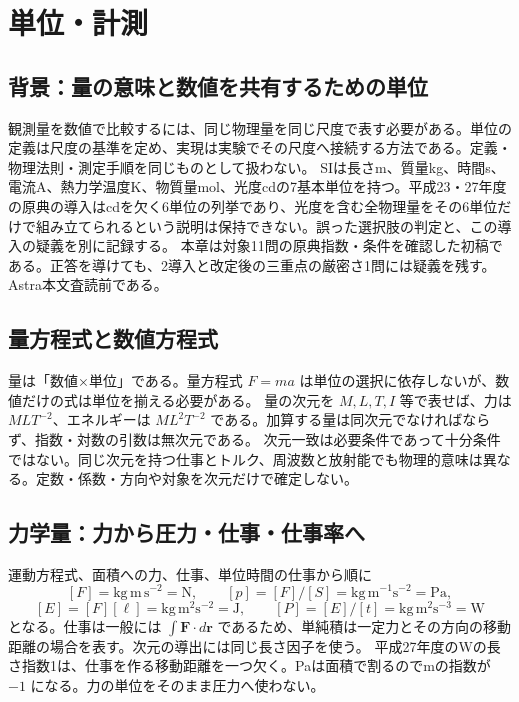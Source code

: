 \chapter{単位・計測}
\section{背景：量の意味と数値を共有するための単位}
観測量を数値で比較するには、同じ物理量を同じ尺度で表す必要がある。単位の定義は尺度の基準を定め、実現は実験でその尺度へ接続する方法である。定義・物理法則・測定手順を同じものとして扱わない。
SIは長さm、質量kg、時間s、電流A、熱力学温度K、物質量mol、光度cdの7基本単位を持つ。平成23・27年度の原典の導入はcdを欠く6単位の列挙であり、光度を含む全物理量をその6単位だけで組み立てられるという説明は保持できない。誤った選択肢の判定と、この導入の疑義を別に記録する\cite{si_brochure9}。
本章は対象11問の原典指数・条件を確認した初稿である。正答を導けても、2導入と改定後の三重点の厳密さ1問には疑義を残す。Astra本文査読前である。

\section{量方程式と数値方程式}\label{theory:units:quantity}
量は「数値×単位」である。量方程式 \(F=ma\) は単位の選択に依存しないが、数値だけの式は単位を揃える必要がある。
量の次元を \(M,L,T,I\) 等で表せば、力は \(MLT^{-2}\)、エネルギーは \(ML^2T^{-2}\) である。加算する量は同次元でなければならず、指数・対数の引数は無次元である。
次元一致は必要条件であって十分条件ではない。同じ次元を持つ仕事とトルク、周波数と放射能でも物理的意味は異なる。定数・係数・方向や対象を次元だけで確定しない。

\section{力学量：力から圧力・仕事・仕事率へ}\label{theory:units:derived}
運動方程式、面積への力、仕事、単位時間の仕事から順に
\[
 [F]=\mathrm{kg\,m\,s^{-2}}=\mathrm N,\qquad
 [p]=[F]/[S]=\mathrm{kg\,m^{-1}s^{-2}}=\mathrm{Pa},
\]
\[
 [E]=[F][\ell]=\mathrm{kg\,m^2s^{-2}}=\mathrm J,\qquad
 [P]=[E]/[t]=\mathrm{kg\,m^2s^{-3}}=\mathrm W
\]
となる。仕事は一般には \(\int\boldsymbol F\cdot d\boldsymbol r\) であるため、単純積は一定力とその方向の移動距離の場合を表す。次元の導出には同じ長さ因子を使う。
平成27年度のWの長さ指数1は、仕事を作る移動距離を一つ欠く。Paは面積で割るのでmの指数が \(-1\) になる。力の単位をそのまま圧力へ使わない\cite{si_nist811}。

